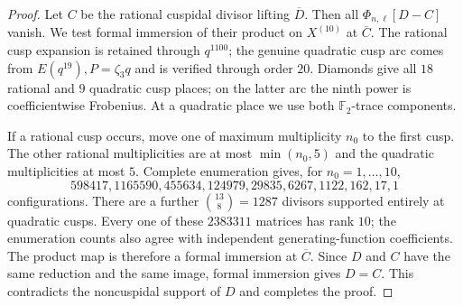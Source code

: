 \begin{proof}
Let $C$ be the rational cuspidal divisor lifting $\overline D$.
Then all $\Phi_{n,\ell}[D-C]$ vanish. We test formal immersion
of their product on $X^{(10)}$ at $\overline C$.
The rational cusp expansion is retained through $q^{1100}$;
the genuine quadratic cusp arc comes from
$E(q^{19}),P=\zeta_3q$ and is verified through order $20$.
Diamonds give all $18$ rational and $9$ quadratic cusp places;
on the latter arc the ninth power is coefficientwise Frobenius.
At a quadratic place we use both $\mathbb F_2$-trace components.

If a rational cusp occurs, move one of maximum multiplicity
$n_0$ to the first cusp. The other rational multiplicities are
at most $\min(n_0,5)$ and the quadratic multiplicities at most
$5$. Complete enumeration gives, for $n_0=1,\ldots,10$,
\[
 598417,1165590,455634,124979,29835,
 6267,1122,162,17,1
\]
configurations. There are a further $\binom{13}{8}=1287$
divisors supported entirely at quadratic cusps. Every one of
these $2383311$ matrices has rank $10$; the enumeration counts
also agree with independent generating-function coefficients.
The product map is therefore a formal immersion at
$\overline C$. Since $D$ and $C$ have the same reduction and
the same image, formal immersion gives $D=C$. This contradicts
the noncuspidal support of $D$ and completes the proof.
\end{proof}
